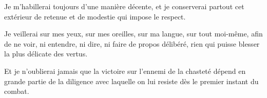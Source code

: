 \documentclass[instructions.tex]{subfiles}
\begin{document}
\primo Je m’habillerai toujours d’une manière décente, et je conserverai partout cet extérieur de retenue et de modestie qui impose le respect.
 
\secundo Je veillerai sur mes yeux, sur mes oreilles, sur ma langue, sur tout moi-même, afin de ne voir, ni entendre, ni dire, ni faire de propos délibéré, rien qui puisse blesser la plus délicate des vertus.
 
\tertio Et je n’oublierai jamais que la victoire sur l'ennemi de la chasteté dépend en grande partie de la diligence avec laquelle on lui resiste dès le premier instant du combat. 

 
\end{document}
